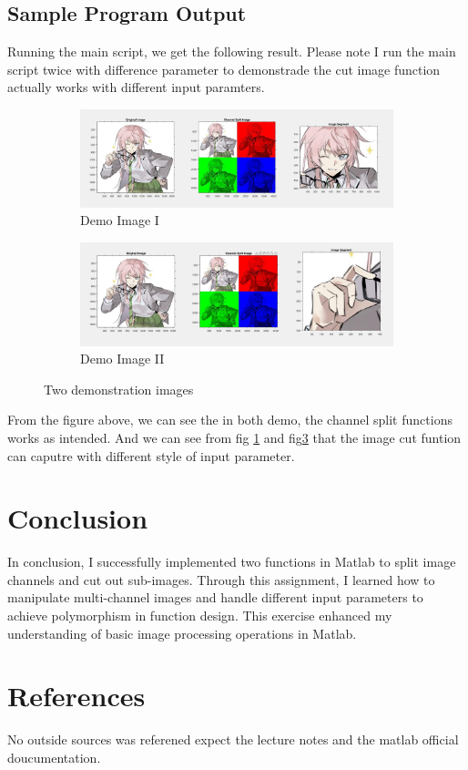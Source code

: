 \documentclass[a4paper,11pt]{article}
\begin{document}
\subsection{Sample Program Output}
Running the main script, we get the following result. Please note I run the main script twice with difference parameter to demonstrade the cut image function actually works with different input paramters.
\begin{figure}[H]
    \centering
    \begin{subfigure}{0.8\textwidth}
        \includegraphics[width=1\linewidth]{Demo1-Head.jpg}
        \caption{Demo Image I}
        \label{pic:d1}
    \end{subfigure}

    \begin{subfigure}{0.8\textwidth}
        \includegraphics[width=1\linewidth]{Deme2-Hand.jpg}
        \caption{Demo Image II}
        \label{pic:d2}
    \end{subfigure}
    \caption{Two demonstration images}
\end{figure}
From the figure above, we can see the in both demo, the channel split functions works as intended. And we can see from fig \ref{pic:d1} and fig\ref{pic:d2} that the image cut funtion can caputre with different style of input parameter.

\section{Conclusion}
In conclusion, I successfully implemented two functions in Matlab to split image channels and cut out sub-images. Through this assignment, I learned how to manipulate multi-channel images and handle different input parameters to achieve polymorphism in function design. This exercise enhanced my understanding of basic image processing operations in Matlab.

\section{References}
No outside sources was referened expect the lecture notes and the matlab official doucumentation.
\end{document}
